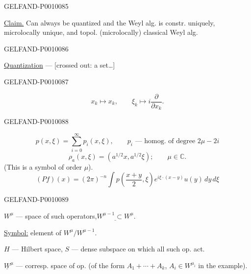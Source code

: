 \begin{GelfandAdjacentEvidence}{GELFAND-P001008}{5}


\underline{Claim.} Can always be quantized and the Weyl alg. is constr. uniquely, microlocally unique, and topol. (microlocally) classical Weyl alg.
\end{GelfandAdjacentEvidence}
\begin{GelfandAdjacentEvidence}{GELFAND-P001008}{6}


\underline{Quantization} --- [crossed out: a set\ldots]
\end{GelfandAdjacentEvidence}
\begin{GelfandAdjacentEvidence}{GELFAND-P001008}{7}


\[
x_k\longmapsto x_k,\qquad \xi_k\longmapsto i\frac{\partial}{\partial x_k}.
\]
\end{GelfandAdjacentEvidence}
\begin{GelfandAdjacentEvidence}{GELFAND-P001008}{8}

\[
p(x,\xi)=\sum_{i=0}^{\infty}p_i(x,\xi),\qquad
p_i\text{ --- homog. of degree }2\mu-2i
\]
\[
\rho_a(x,\xi)=(a^{1/2}x,a^{1/2}\xi);\qquad \mu\in\mathbb C.
\]
(This is a symbol of order $\mu$).
\[
(Pf)(x)=(2\pi)^{-n}\int p\left(\frac{x+y}{2},\xi\right)
  e^{i\xi\cdot(x-y)}u(y)\,dy\,d\xi
\]
\end{GelfandAdjacentEvidence}
\begin{GelfandAdjacentEvidence}{GELFAND-P001008}{9}


$W^\mu$ --- space of such operators,\qquad $\underline{W^{\mu-1}\subset W^\mu}$.

\underline{Symbol:} element of $W^\mu/W^{\mu-1}$.

$H$ --- Hilbert space, $S$ --- dense subspace on which all such op. act.

$\underline W^\mu$ --- corresp. space of op.
(of the form $A_1+\cdots+A_k$, $A_i\in W^{\mu_i}$ in the example).
\end{GelfandAdjacentEvidence}


